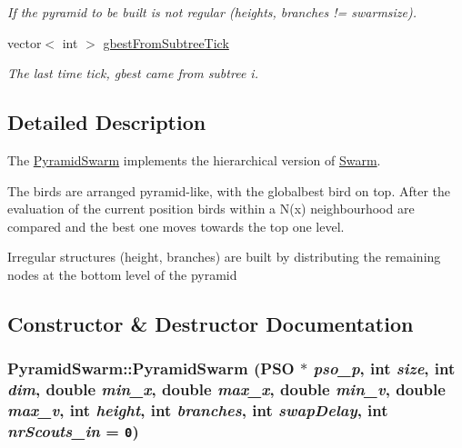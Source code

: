 \begin{CompactItemize}
\begin{CompactList}\small\item\em If the pyramid to be built is not regular (heights, branches != swarmsize). \item\end{CompactList}\item 
vector$<$ int $>$ \hyperlink{classPyramidSwarm_73623ddb46a59321d00049c3ae64c459}{gbestFromSubtreeTick}
\begin{CompactList}\small\item\em The last time tick, gbest came from subtree i. \item\end{CompactList}\end{CompactItemize}


\subsection{Detailed Description}
The \hyperlink{classPyramidSwarm}{PyramidSwarm} implements the hierarchical version of \hyperlink{classSwarm}{Swarm}. 

The birds are arranged pyramid-like, with the globalbest bird on top. After the evaluation of the current position birds within a N(x) neighbourhood are compared and the best one moves towards the top one level.\par
 Irregular structures (height, branches) are built by distributing the remaining nodes at the bottom level of the pyramid 

\subsection{Constructor \& Destructor Documentation}
\hypertarget{classPyramidSwarm_300ed83e7f46ecf8895d5ab8a0bb7ad8}{
\subsubsection{\setlength{\rightskip}{0pt plus 5cm}PyramidSwarm::PyramidSwarm ({\bf PSO} $\ast$ {\em pso\_\-p}, \/  int {\em size}, \/  int {\em dim}, \/  double {\em min\_\-x}, \/  double {\em max\_\-x}, \/  double {\em min\_\-v}, \/  double {\em max\_\-v}, \/  int {\em height}, \/  int {\em branches}, \/  int {\em swapDelay}, \/  int {\em nrScouts\_\-in} = {\tt 0})}}
\label{classPyramidSwarm_300ed83e7f46ecf8895d5ab8a0bb7ad8}


